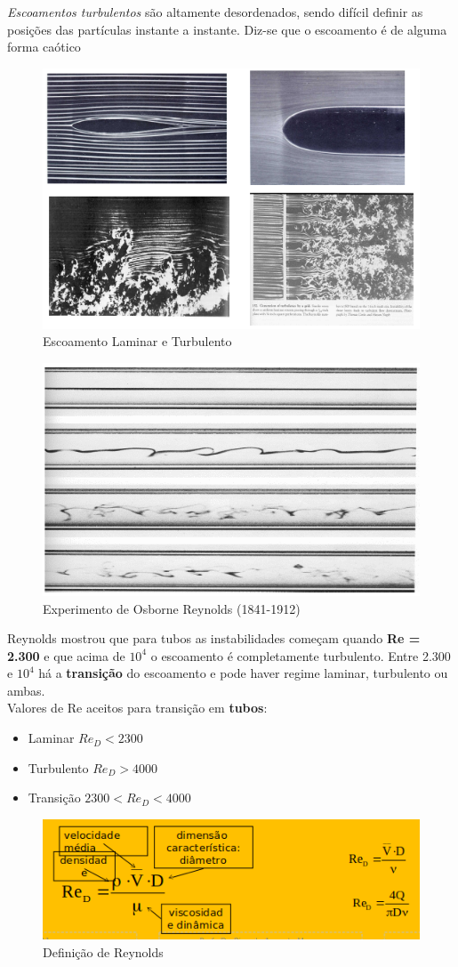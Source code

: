 \documentclass[a4paper, 12pt]{article}
\begin{document}
	\textit{Escoamentos turbulentos} são altamente desordenados, sendo difícil definir as posições das partículas instante a instante. Diz-se que o escoamento é de alguma forma caótico
	\begin{figure}[h]
		\centering
		\includegraphics[width=0.7\linewidth]{imagens/escoamento}
		\caption{Escoamento Laminar e Turbulento}
		\label{fig:escoamento}
	\end{figure}
	\begin{figure}[h]
		\centering
		\includegraphics[width=0.7\linewidth]{imagens/escoamento1}
		\caption{Experimento de Osborne Reynolds (1841-1912)}
		\label{fig:escoamento1}
	\end{figure}

	Reynolds mostrou que para tubos as instabilidades começam quando \textbf{Re = 2.300} e que acima de \textbf{$10^4$} o escoamento é completamente turbulento.
	Entre 2.300 e $10^4$ há a \textbf{transição} do escoamento e pode haver regime laminar, turbulento ou ambas.\\
	
	Valores de Re aceitos para transição em \textbf{tubos}:
	\begin{itemize}
		\item Laminar $Re_D < 2300$
		\item Turbulento $Re_D > 4000$
		\item Transição $2300 < Re_D < 4000$
	\end{itemize}
	\begin{figure}[h]
		\centering
		\includegraphics[width=0.7\linewidth]{imagens/re}
		\caption{Definição de Reynolds}
		\label{fig:re}
	\end{figure}
\end{document}
